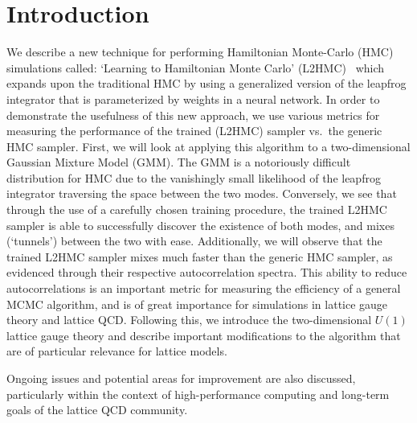 \documentclass[main.tex]{subfiles}
\begin{document}
\section{Introduction}%
\label{sec:l2hmc_intro}
%
We describe a new technique for performing Hamiltonian Monte-Carlo (HMC) simulations called: `Learning to Hamiltonian
Monte Carlo' (L2HMC)~\cite{2017arXiv171109268L} which expands upon the traditional HMC by using a generalized version
of the leapfrog integrator that is parameterized by weights in a neural network.
%
In order to demonstrate the usefulness of this new approach, we use various metrics for measuring the performance of
the trained (L2HMC) sampler vs.\ the generic HMC sampler.
%
First, we will look at applying this algorithm to a two-dimensional Gaussian Mixture Model (GMM).
%
The GMM is a notoriously difficult distribution for HMC due to the vanishingly small likelihood of the leapfrog
integrator traversing the space between the two modes.
%
Conversely, we see that through the use of a carefully chosen training procedure, the trained L2HMC sampler is able to
successfully discover the existence of both modes, and mixes (`tunnels') between the two with ease. 
%
Additionally, we will observe that the trained L2HMC sampler mixes much faster than the generic HMC sampler, as
evidenced through their respective autocorrelation spectra.
%
This ability to reduce autocorrelations is an important metric for measuring the efficiency of a general MCMC
algorithm, and is of great importance for simulations in lattice gauge theory and lattice QCD.
%
Following this, we introduce the two-dimensional $U(1)$ lattice gauge theory and describe important modifications to
the algorithm that are of particular relevance for lattice models.
%
%

%
Ongoing issues and potential areas for improvement are also discussed, particularly within the context of
high-performance computing and long-term goals of the lattice QCD community.
%
\end{document}
